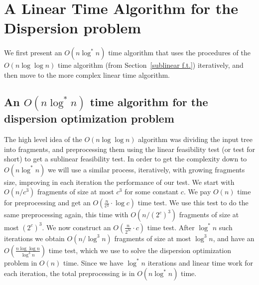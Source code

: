\documentclass[11pt,a4paper]{article}
\theoremstyle{definition}
\theoremstyle{remark}
\begin{document}
\section{A Linear Time Algorithm for the Dispersion problem}\label{linear algorithm for the dispersion optimization problem}

We first present an $O(n \log^* n)$ time algorithm that uses the procedures of the $O(n \log \log n)$ time algorithm (from Section~\ref{sublinear f.t.}) iteratively, and then move to the more complex linear time algorithm.

\subsection{An \texorpdfstring{\boldmath$O(n\log^{*}n)$}{O(nlog^*n)} time algorithm for the dispersion optimization problem} \label{sectionlog*}
The high level idea of the $O(n \log \log n)$ algorithm was dividing the input tree into fragments, and preprocessing them using the linear feasibility test (or test for short) to get a sublinear feasibility test. In order to get the complexity down to $O(n \log^*n)$ we will use a similar process, iteratively, with growing fragments size, improving in each iteration the performance of our test.
We start with $O(n/c^{3})$ fragments of size at most $c^3$ for some constant $c$.
We pay $O(n)$ time for preprocessing and get an $O(\frac{n}{c^3} \cdot \log c)$ time test.
We use this test to do the same preprocessing again, this time with $O(n/(2^{c})^{3})$ fragments of size at most $(2^c)^3$.
We now construct an $O(\frac{n}{2^{3c}} \cdot c)$ time test.
After $\log^*n$ such iterations we obtain $O(n/\log^{3}n)$ fragments of size at most $\log ^3n$, and have
an $O(\frac{n \log \log n}{\log ^3n})$ time test, which we use to solve the dispersion optimization problem in $O(n)$ time. Since we have $\log^*n$ iterations and linear time work for each
iteration, the total preprocessing is in $O(n \log^*n)$ time.
\end{document}
